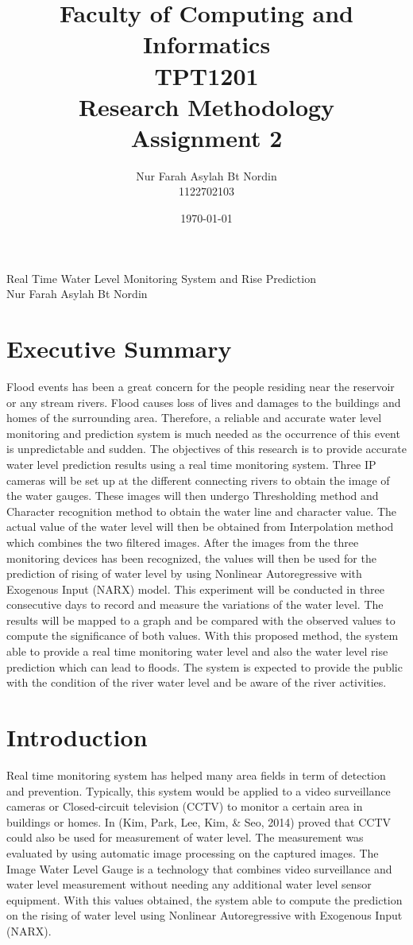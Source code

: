 \documentclass[12pt,a4paper,openany]{report}
\title{Faculty of Computing and Informatics\\
TPT1201\\
Research Methodology\\
Assignment 2\\}
\author{ Nur Farah Asylah Bt Nordin \\
1122702103 \\}
\date{\today}
\begin{document}
\maketitle
\pagebreak 
\begin{center}
\Huge {Real Time Water Level Monitoring System and Rise Prediction }\\
\small Nur Farah Asylah Bt Nordin
\end{center}

\section{Executive Summary}
Flood events has been a great concern for the people residing near the reservoir or any stream rivers. Flood causes loss of lives and damages to the buildings and homes of the surrounding area. Therefore, a reliable and accurate water level monitoring and prediction system is much needed as the occurrence of this event is unpredictable and sudden. The objectives of this research is to provide accurate water level prediction results using a real time monitoring system. Three IP cameras will be set up at the different connecting rivers to obtain the image of the water gauges. These images will then undergo Thresholding method and Character recognition method to obtain the water line and character value. The actual value of the water level will then be obtained from Interpolation method which combines the two filtered images. After the images from the three monitoring devices has been recognized, the values will then be used for the prediction of rising of water level by using Nonlinear Autoregressive with Exogenous Input (NARX) model. This experiment will be conducted in three consecutive days to record and measure the variations of the water level. The results will be mapped to a graph and be compared with the observed values to compute the significance of both values. With this proposed method, the system able to provide a real time monitoring water level and also the water level rise prediction which can lead to floods. The system is expected to provide the public with the condition of the river water level and be aware of the river activities.




\section{Introduction}
Real time monitoring system has helped many area fields in term of detection and prevention. Typically, this system would be applied to a video surveillance cameras or Closed-circuit television (CCTV) to monitor a certain area in buildings or homes. In (Kim, Park, Lee, Kim, & Seo, 2014) proved that CCTV could also be used for measurement of water level. The measurement was evaluated by using automatic image processing on the captured images. The Image Water Level Gauge is a technology that combines video surveillance and water level measurement without needing any additional water level sensor equipment.
With this values obtained, the system able to compute the prediction on the rising of water level using Nonlinear Autoregressive with Exogenous Input (NARX).
\end{document}
